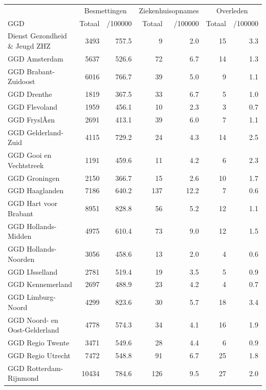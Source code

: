 \documentclass[
  english,
  man,floatsintext]{apa6}
\begin{document}
\begin{table}
\centering\begingroup\fontsize{10}{12}\selectfont

\begin{threeparttable}
\begin{tabular}{lrrrrrr}
\toprule
\multicolumn{1}{c}{ } & \multicolumn{2}{c}{Besmettingen} & \multicolumn{2}{c}{Ziekenhuisopnames} & \multicolumn{2}{c}{Overleden} \\
\cmidrule(l{3pt}r{3pt}){2-3} \cmidrule(l{3pt}r{3pt}){4-5} \cmidrule(l{3pt}r{3pt}){6-7}
GGD & Totaal & /100000 & Totaal & /100000 & Totaal & /100000\\
\midrule
Dienst Gezondheid \& Jeugd ZHZ & 3493 & 757.5 & 9 & 2.0 & 15 & 3.3\\
GGD Amsterdam & 5637 & 526.6 & 72 & 6.7 & 14 & 1.3\\
GGD Brabant-Zuidoost & 6016 & 766.7 & 39 & 5.0 & 9 & 1.1\\
GGD Drenthe & 1819 & 367.5 & 33 & 6.7 & 5 & 1.0\\
GGD Flevoland & 1959 & 456.1 & 10 & 2.3 & 3 & 0.7\\
GGD FryslÃ¢n & 2691 & 413.1 & 39 & 6.0 & 7 & 1.1\\
GGD Gelderland-Zuid & 4115 & 729.2 & 24 & 4.3 & 14 & 2.5\\
GGD Gooi en Vechtstreek & 1191 & 459.6 & 11 & 4.2 & 6 & 2.3\\
GGD Groningen & 2150 & 366.7 & 15 & 2.6 & 10 & 1.7\\
GGD Haaglanden & 7186 & 640.2 & 137 & 12.2 & 7 & 0.6\\
GGD Hart voor Brabant & 8951 & 828.8 & 56 & 5.2 & 12 & 1.1\\
GGD Hollands-Midden & 4975 & 610.4 & 73 & 9.0 & 12 & 1.5\\
GGD Hollands-Noorden & 3056 & 458.6 & 13 & 2.0 & 4 & 0.6\\
GGD IJsselland & 2781 & 519.4 & 19 & 3.5 & 5 & 0.9\\
GGD Kennemerland & 2697 & 488.9 & 23 & 4.2 & 4 & 0.7\\
GGD Limburg-Noord & 4299 & 823.6 & 30 & 5.7 & 18 & 3.4\\
GGD Noord- en Oost-Gelderland & 4778 & 574.3 & 34 & 4.1 & 16 & 1.9\\
GGD Regio Twente & 3471 & 549.6 & 28 & 4.4 & 6 & 0.9\\
GGD Regio Utrecht & 7472 & 548.8 & 91 & 6.7 & 25 & 1.8\\
GGD Rotterdam-Rijnmond & 10434 & 784.6 & 126 & 9.5 & 27 & 2.0\\

\end{tabular}
\end{threeparttable}
\end{table}
\end{document}
